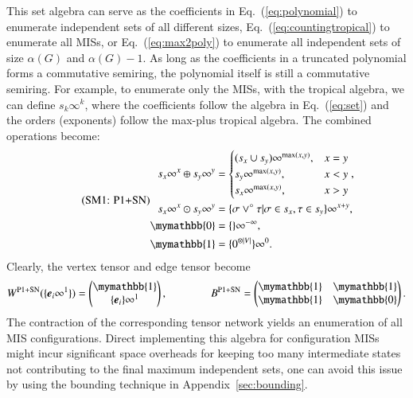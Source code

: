 \documentclass[onefignum, onetabnum]{siamart190516}
\newcommand{\eqname}[1]{\stepcounter{equation}\tag{\theequation : #1}}
\newcommand{\<}{\langle}
\renewcommand{\>}{\rangle}
\newcommand{\Eq}[1]{Eq.~(\ref{#1})}
\newcommand{\App}[1]{Appendix~\ref{#1}}
\newcounter{example}
\begin{document}
This set algebra can serve as the coefficients in \Eq{eq:polynomial} to enumerate independent sets of all different sizes, \Eq{eq:countingtropical} to enumerate all MISs,
or \Eq{eq:max2poly} to enumerate all independent sets of size $\alpha(G)$ and $\alpha(G)-1$.
As long as the coefficients in a truncated polynomial forms a commutative semiring, the polynomial itself is still a commutative semiring.
For example, to enumerate only the MISs, with the tropical algebra, we can define $s_{k}\infty^k$,
where the coefficients follow the algebra in \Eq{eq:set} and the orders (exponents) follow the max-plus tropical algebra.
The combined operations become: 
\begin{equation}
\eqname{P1+SN}
\begin{split}
    s_x\infty^x \oplus s_y\infty^y &= \begin{cases}
        (s_x \cup s_y)\infty^{\max(x,y)}, & x = y\\
        s_y\infty^{\max(x,y)}, & x < y\\
        s_x\infty^{\max(x,y)}, & x > y
    \end{cases},\\
    s_x\infty^x \odot s_y\infty^y &= \{\sigma \lor^\circ \tau | \sigma \in s_x, \tau \in s_y\}\infty^{x+y},\\
    \mymathbb{0} &= \{\}\infty^{-\infty},\\
    \mymathbb{1} &= \{0^{\otimes |V|}\}\infty^{0}. \label{eq:countingtropicalset}
\end{split}
\end{equation}
Clearly, the vertex tensor and edge tensor become
\begin{equation}
    W^{\rm P1+SN}(\{\boldsymbol{e}_{i}\infty^1\}) = \left(\begin{matrix}
        \mymathbb{1} \\
        \{\boldsymbol{e}_{i}\}\infty^1
    \end{matrix}\right),   
    \qquad \qquad
        B^{\rm P1+SN} = \left(\begin{matrix}
        \mymathbb{1}  & \mymathbb{1} \\
        \mymathbb{1} & \mymathbb{0}
    \end{matrix}\right).
\end{equation}
The contraction of the corresponding tensor network yields an enumeration of all MIS configurations.
Direct implementing this algebra for configuration MISs might incur significant space overheads for keeping too many intermediate states not contributing to the final maximum independent sets,
one can avoid this issue by using the bounding technique in \App{sec:bounding}.
\end{document}
